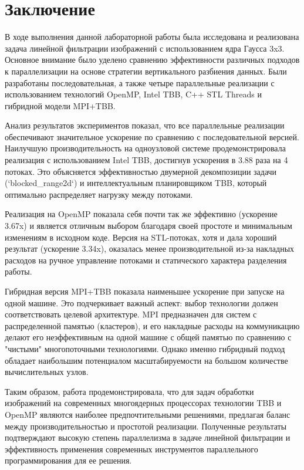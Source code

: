 \documentclass[12pt,a4paper]{extarticle}
\begin{document}
\newpage
\section{Заключение}
В ходе выполнения данной лабораторной работы была исследована и реализована задача линейной фильтрации изображений с использованием ядра Гаусса 3x3. Основное внимание было уделено сравнению эффективности различных подходов к параллелизации на основе стратегии вертикального разбиения данных. Были разработаны последовательная, а также четыре параллельные реализации с использованием технологий OpenMP, Intel TBB, C++ STL Threads и гибридной модели MPI+TBB.

Анализ результатов экспериментов показал, что все параллельные реализации обеспечивают значительное ускорение по сравнению с последовательной версией. Наилучшую производительность на одноузловой системе продемонстрировала реализация с использованием Intel TBB, достигнув ускорения в 3.88 раза на 4 потоках. Это объясняется эффективностью двумерной декомпозиции задачи (`blocked_range2d`) и интеллектуальным планировщиком TBB, который оптимально распределяет нагрузку между потоками.

Реализация на OpenMP показала себя почти так же эффективно (ускорение 3.67x) и является отличным выбором благодаря своей простоте и минимальным изменениям в исходном коде. Версия на STL-потоках, хотя и дала хороший результат (ускорение 3.34x), оказалась менее производительной из-за накладных расходов на ручное управление потоками и статического характера разделения работы.

Гибридная версия MPI+TBB показала наименьшее ускорение при запуске на одной машине. Это подчеркивает важный аспект: выбор технологии должен соответствовать целевой архитектуре. MPI предназначен для систем с распределенной памятью (кластеров), и его накладные расходы на коммуникацию делают его неэффективным на одной машине с общей памятью по сравнению с "чистыми" многопоточными технологиями. Однако именно гибридный подход обладает наибольшим потенциалом масштабируемости на большом количестве вычислительных узлов.

Таким образом, работа продемонстрировала, что для задач обработки изображений на современных многоядерных процессорах технологии TBB и OpenMP являются наиболее предпочтительными решениями, предлагая баланс между производительностью и простотой реализации. Полученные результаты подтверждают высокую степень параллелизма в задаче линейной фильтрации и эффективность применения современных инструментов параллельного программирования для ее решения.
\end{document}
